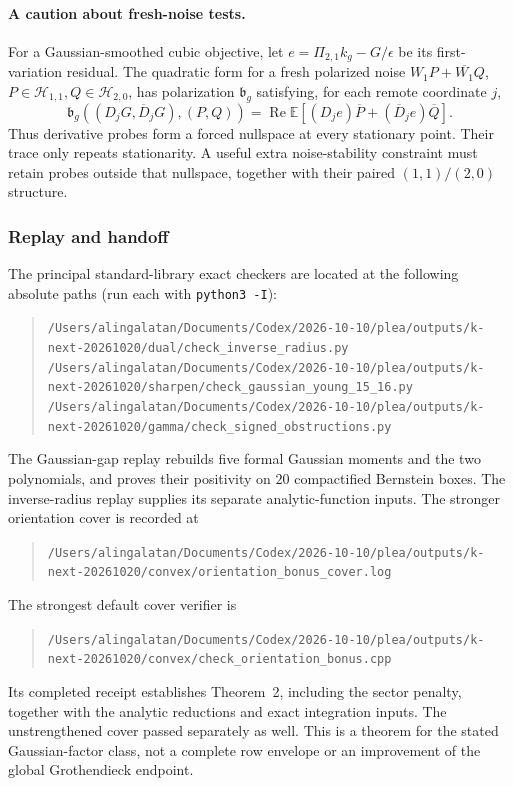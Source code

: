 \paragraph{A caution about fresh-noise tests.}
For a Gaussian-smoothed cubic objective, let
$e=\Pi_{2,1}k_g-G/\epsilon$ be its first-variation residual.  The quadratic
form for a fresh polarized noise $W_1P+\overline{W_1}Q$,
$P\in\mathcal H_{1,1},Q\in\mathcal H_{2,0}$, has polarization
$\mathfrak b_g$ satisfying, for each remote coordinate $j$,
\[
 \mathfrak b_g((D_jG,\overline D_jG),(P,Q))
 =\operatorname{Re}\mathbb E[
       (D_je)\overline P+(\overline D_je)\overline Q].
\]
Thus derivative probes form a forced nullspace at every stationary point.
Their trace only repeats stationarity.  A useful extra noise-stability
constraint must retain probes outside that nullspace, together with their
paired $(1,1)/(2,0)$ structure.

\subsubsection{Replay and handoff}

The principal standard-library exact checkers are located at the following
absolute paths (run each with \texttt{python3 -I}):
\begin{quote}\small\ttfamily\raggedright
\nolinkurl{/Users/alingalatan/Documents/Codex/2026-10-10/plea/outputs/k-next-20261020/dual/check_inverse_radius.py}\\[3pt]
\nolinkurl{/Users/alingalatan/Documents/Codex/2026-10-10/plea/outputs/k-next-20261020/sharpen/check_gaussian_young_15_16.py}\\[3pt]
\nolinkurl{/Users/alingalatan/Documents/Codex/2026-10-10/plea/outputs/k-next-20261020/gamma/check_signed_obstructions.py}
\end{quote}
The Gaussian-gap replay rebuilds five formal Gaussian moments and the two
polynomials, and proves their positivity on $20$ compactified Bernstein
boxes.  The inverse-radius replay supplies its separate analytic-function
inputs.  The stronger orientation cover is recorded at
\begin{quote}\small\ttfamily\raggedright
\nolinkurl{/Users/alingalatan/Documents/Codex/2026-10-10/plea/outputs/k-next-20261020/convex/orientation_bonus_cover.log}
\end{quote}
The strongest default cover verifier is
\begin{quote}\small\ttfamily\raggedright
\nolinkurl{/Users/alingalatan/Documents/Codex/2026-10-10/plea/outputs/k-next-20261020/convex/check_orientation_bonus.cpp}
\end{quote}
Its completed receipt establishes Theorem~2, including the sector penalty,
together with the analytic reductions and exact integration inputs.  The
unstrengthened cover passed separately as well.  This is a theorem for the
stated Gaussian-factor class, not a complete row envelope or an improvement
of the global Grothendieck endpoint.

